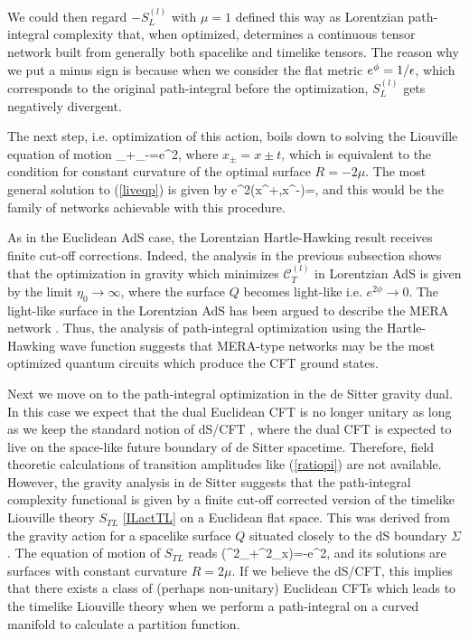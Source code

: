 \documentclass[a4paper,12pt]{article}
\begin{document}
We could then regard $-S^{(l)}_L$ with $\mu=1$ defined this way as Lorentzian path-integral complexity that, when optimized, determines a continuous tensor network built from generally both spacelike and timelike tensors. The reason why we put a minus sign is because when we consider the flat metric $e^\phi=1/\epsilon$, which corresponds to the original path-integral before the optimization, $S^{(l)}_L$ gets negatively divergent.

The next step, i.e. optimization of this action, boils down to solving the Liouville equation of motion 
\partial_+\partial_-\phi=\mu e^{2\phi},  \label{liveqp}
\ee
where $x_\pm=x\pm t$, which is equivalent to the condition for constant curvature of the optimal surface $R=-2\mu$.  The most general solution to (\ref{liveqp}) is given by
\be
e^{2\phi(x^+,x^-)}=,
\ee
and this would be the family of networks achievable with this procedure.

As in the Euclidean AdS case, the Lorentzian Hartle-Hawking result receives finite cut-off corrections. Indeed, the analysis in the previous subsection shows that the optimization in gravity which minimizes  $\mathcal{C}^{(l)}_T$ in Lorentzian AdS is given by the limit $\eta_0\to \infty$, where the surface $Q$ becomes light-like i.e. $e^{2\phi}\to 0$. The light-like surface in the Lorentzian AdS has been argued to describe the MERA network \cite{Milsted:2018yur,Milsted:2018san,Takayanagi:2018pml}. Thus, the analysis of path-integral optimization using the Hartle-Hawking wave function suggests that MERA-type networks may be the most optimized quantum circuits which produce the CFT ground states.

Next we move on to the path-integral optimization in the de Sitter gravity dual. 
In this case we expect that the dual Euclidean CFT 
is no longer unitary as long as we keep the standard notion of 
dS/CFT \cite{Strominger:2001pn,Maldacena:2002vr}, where the dual CFT is expected to live on the space-like future boundary of de Sitter spacetime. Therefore, field theoretic calculations of transition amplitudes like (\ref{ratiopi}) are not available. However, the gravity analysis in de Sitter suggests that the path-integral complexity functional is 
given by a finite cut-off corrected version of the timelike Liouville theory $S_{TL}$ \eqref{ILactTL} on a Euclidean flat space. This was derived from the gravity action for a spacelike surface $Q$ situated closely to the dS boundary $\Sigma$.
The equation of motion of $S_{TL}$ reads
\ba
(\de^2_\tau+\de^2_x)\phi=-\mu e^{2\phi},  \label{hyepwqa}
\ea
and its solutions are surfaces with constant curvature $R=2\mu$. If we believe the dS/CFT, this implies that there exists a class of (perhaps non-unitary) Euclidean CFTs which leads to the timelike Liouville theory when we perform  a path-integral on a curved manifold to calculate a partition function.
\end{document}
